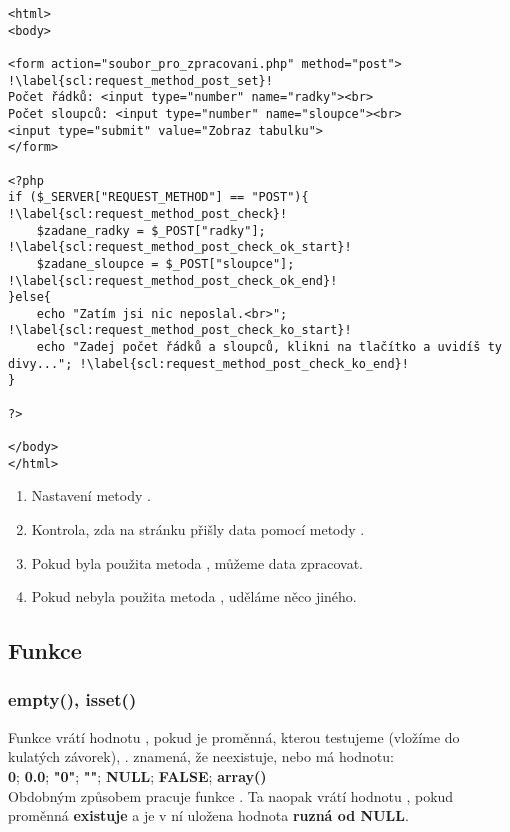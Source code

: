 \begin{minipage}[t]{.45\textwidth}
\begin{code}
\begin{verbatim}
<html>
<body>

<form action="soubor_pro_zpracovani.php" method="post"> !\label{scl:request_method_post_set}!
Počet řádků: <input type="number" name="radky"><br>
Počet sloupců: <input type="number" name="sloupce"><br>
<input type="submit" value="Zobraz tabulku">
</form>

<?php
if ($_SERVER["REQUEST_METHOD"] == "POST"){ !\label{scl:request_method_post_check}!
	$zadane_radky = $_POST["radky"];	!\label{scl:request_method_post_check_ok_start}!
	$zadane_sloupce = $_POST["sloupce"];	!\label{scl:request_method_post_check_ok_end}!
}else{
	echo "Zatím jsi nic neposlal.<br>"; !\label{scl:request_method_post_check_ko_start}!
	echo "Zadej počet řádků a sloupců, klikni na tlačítko a uvidíš ty divy...";	!\label{scl:request_method_post_check_ko_end}!
}

?> 

</body>
</html> 
\end{verbatim}

\label{code:php_form_post}
\end{code}
\end{minipage}
\begin{minipage}[t]{.45\textwidth}
\vspace{7cm}
\begin{enumerate}
\item[ř. \ref{scl:request_method_post_set}:] Nastavení metody .
\item[ř. \ref{scl:request_method_post_check}] Kontrola, zda na stránku přišly data pomocí metody .  
\item[ř. \ref{scl:request_method_post_check_ok_start}-\ref{scl:request_method_post_check_ok_end}:] Pokud byla použita metoda , můžeme data zpracovat.
\item[ř. \ref{scl:request_method_post_check_ko_start}-\ref{scl:request_method_post_check_ko_end}:] Pokud nebyla použita metoda , uděláme něco jiného.
\end{enumerate}
\end{minipage}

\subsection{Funkce}
\subsubsection{empty(), isset()}
Funkce  vrátí hodnotu , pokud je proměnná, kterou testujeme (vložíme do kulatých závorek), .  znamená, že neexistuje, nebo má hodnotu:\\ \textbf{0}; \textbf{0.0}; \textbf{"0"}; \textbf{""}; \textbf{NULL}; \textbf{FALSE}; \textbf{array()}\\
Obdobným způsobem pracuje funkce . Ta naopak vrátí hodnotu , pokud proměnná \textbf{existuje} a je v ní uložena hodnota \textbf{ruzná od NULL}.

